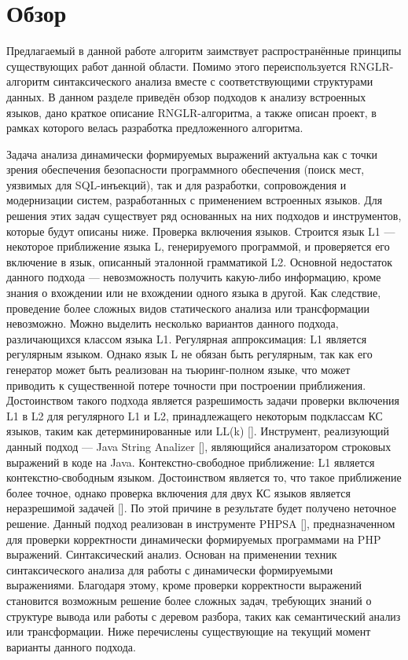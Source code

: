 \section{Обзор}
Предлагаемый в данной работе алгоритм заимствует распространённые принципы существующих работ данной области. Помимо этого переиспользуется RNGLR-алгоритм синтаксического анализа вместе с соответствующими структурами данных. В данном разделе приведён обзор подходов к анализу встроенных языков, дано краткое описание RNGLR-алгоритма, а также описан проект, в рамках которого велась разработка предложенного алгоритма.

Задача анализа динамически формируемых выражений актуальна как с точки зрения обеспечения безопасности программного обеспечения (поиск мест, уязвимых для SQL-инъекций), так и для разработки, сопровождения и модернизации систем, разработанных с применением встроенных языков. Для решения этих задач существует ряд основанных на них подходов и инструментов, которые будут описаны ниже.
Проверка включения языков. Строится язык L1 —  некоторое приближение языка L, генерируемого программой, и проверяется его включение в язык, описанный эталонной грамматикой L2. Основной недостаток данного подхода — невозможность получить какую-либо информацию, кроме знания о вхождении или не вхождении одного языка в другой. Как следствие, проведение более сложных видов статического анализа или трансформации невозможно. Можно выделить несколько вариантов данного подхода, различающихся классом языка L1.
Регулярная аппроксимация: L1 является регулярным языком. Однако язык L не обязан быть регулярным, так как его генератор может быть реализован на тьюринг-полном языке, что может приводить к существенной потере точности при построении приближения. Достоинством такого подхода является разрешимость задачи проверки включения L1 в L2 для регулярного L1 и L2, принадлежащего некоторым подклассам КС языков, таким как детерминированные или LL(k) []. Инструмент, реализующий данный подход —  Java String Analizer [], являющийся анализатором строковых выражений в коде на Java.
Контекстно-свободное приближение: L1 является контекстно-свободным языком.  Достоинством является то, что такое приближение более точное, однако проверка включения для двух КС языков является неразрешимой задачей []. По  этой причине в результате будет получено неточное решение. Данный подход реализован в инструменте PHPSA [], предназначенном для проверки корректности динамически формируемых программами на PHP выражений.
Синтаксический анализ. Основан на применении техник синтаксического анализа для работы с динамически формируемыми выражениями. Благодаря этому, кроме проверки корректности выражений становится возможным решение более сложных задач, требующих знаний о структуре вывода или работы с деревом разбора, таких как семантический анализ или трансформации. Ниже перечислены существующие на текущий момент варианты данного подхода.
